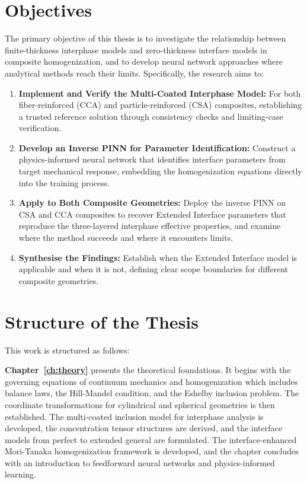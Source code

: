 \documentclass[oneside, 12pt, a4paper, bibliography=totoc]{book}
\begin{document}
\section{Objectives}

The primary objective of this thesis is to investigate the relationship between finite-thickness interphase models and zero-thickness interface models in composite homogenization, and to develop neural network approaches where analytical methods reach their limits. Specifically, the research aims to:

\begin{enumerate}
    \item \textbf{Implement and Verify the Multi-Coated Interphase Model:} For both fiber-reinforced (CCA) and particle-reinforced (CSA) composites, establishing a trusted reference solution through consistency checks and limiting-case verification.

    \item \textbf{Develop an Inverse PINN for Parameter Identification:} Construct a physics-informed neural network that identifies interface parameters from target mechanical response, embedding the homogenization equations directly into the training process.

    \item \textbf{Apply to Both Composite Geometries:} Deploy the inverse PINN on CSA and CCA composites to recover Extended Interface parameters that reproduce the three-layered interphase effective properties, and examine where the method succeeds and where it encounters limits.

    \item \textbf{Synthesise the Findings:} Establish when the Extended Interface model is applicable and when it is not, defining clear scope boundaries for different composite geometries.
\end{enumerate}

\section{Structure of the Thesis}

This work is structured as follows:

\textbf{Chapter~\ref{ch:theory}} presents the theoretical foundations. It begins with the governing equations of continuum mechanics and homogenization which includes balance laws, the Hill-Mandel condition, and the Eshelby inclusion problem. The coordinate transformations for cylindrical and spherical geometries is then established. The multi-coated inclusion model for interphase analysis is developed, the concentration tensor structures are derived, and the interface models from perfect to extended general are formulated. The interface-enhanced Mori-Tanaka homogenization framework is developed, and the chapter concludes with an introduction to feedforward neural networks and physics-informed learning.
\end{document}
